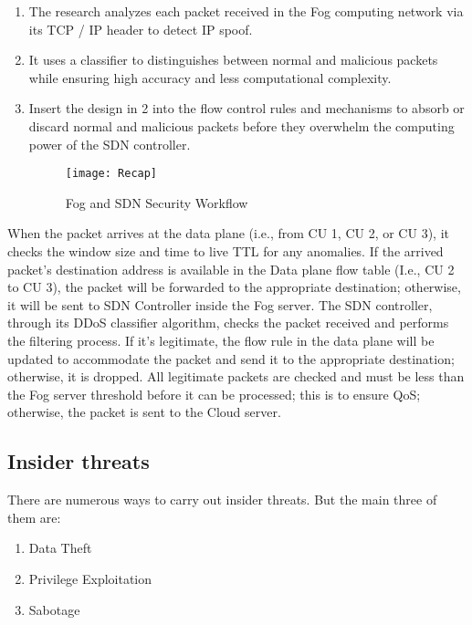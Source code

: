 \documentclass{ijitcs}
\begin{document}
\begin{enumerate}
    \item The research analyzes each packet received in the Fog computing network via its TCP / IP header to detect IP spoof.
    \item It uses a classifier to distinguishes between normal and malicious packets while ensuring high accuracy and less computational complexity.
    \item Insert the design in 2 into the flow control rules and mechanisms to absorb or discard normal and malicious packets before they overwhelm the computing power of the SDN controller.
  
    \begin{figure}[H]
        \centering
        \texttt{[image: Recap]}
        \caption{Fog and SDN Security Workflow}
        \label{fig:Workflow}
    \end{figure}
    
\end{enumerate}
 When the packet arrives at the data plane (i.e., from CU 1, CU 2, or CU 3), it checks the window size and time to live TTL for any anomalies. If the arrived packet's destination address is available in the Data plane flow table (I.e., CU 2 to CU 3), the packet will be forwarded to the appropriate destination; otherwise, it will be sent to SDN Controller inside the Fog server. The SDN controller, through its DDoS classifier algorithm, checks the packet received and performs the filtering process. If it's legitimate, the flow rule in the data plane will be updated to accommodate the packet and send it to the appropriate destination; otherwise, it is dropped. All legitimate packets are checked and must be less than the Fog server threshold before it can be processed; this is to ensure QoS; otherwise, the packet is sent to the Cloud server.\\
\subsection{Insider threats}
There are numerous ways
to carry out insider threats. But the main three of them are:
\begin{enumerate}
    \item Data Theft
    \item Privilege Exploitation
    \item Sabotage\cite{singh2022systematic}
\end{enumerate}
\end{document}
